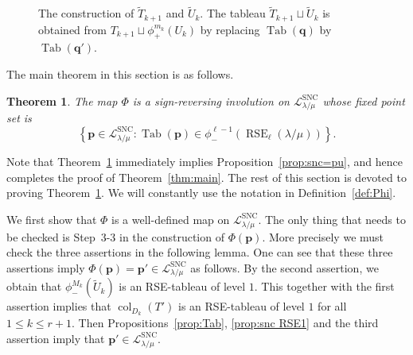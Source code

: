 \documentclass{amsart}
\numberwithin{equation}{section}
\newtheorem{thm}{Theorem}[section]
\theoremstyle{definition}
\newcommand\Tab{\operatorname{Tab}}
\newcommand\LL{\mathcal{L}_\lm}
\newcommand\lsnc{\LL^{\operatorname{SNC}}}
\newcommand\col{\operatorname{col}}
\newcommand\pd{\phi_+}
\newcommand\pu{\phi_-}
\newcommand\RSE{\operatorname{RSE}}
\newcommand\pp{\mathbf{p}}
\newcommand\lm{{\lambda/\mu}}
\begin{document}
\begin{figure}
  \caption{The construction of $\widetilde{T}_{k+1}$ and $\widetilde{U}_{k}$.
    The tableau $\widetilde{T}_{k+1}\sqcup\widetilde{U}_{k}$ is obtained from
    $T_{k+1}\sqcup\pd^{m_k}(U_k)$ by replacing $\Tab(\mathbf{q})$ by
    $\Tab(\mathbf{q'})$.}
  \label{fig:qq'}
\end{figure}


The main theorem in this section is as follows.

\begin{thm}\label{thm:involution}
  The map $\Phi$ is a sign-reversing involution on $\lsnc$ whose fixed point set is
  \[
\left\{\pp\in\lsnc: \Tab(\pp)\in \pu^{\ell-1}(\RSE_\ell(\lm))\right\}.
  \]
\end{thm}

Note that Theorem~\ref{thm:involution} immediately implies
Proposition~\ref{prop:snc=pu}, and hence completes the proof of
Theorem~\ref{thm:main}. The rest of this section is devoted to proving
Theorem~\ref{thm:involution}. We will constantly use the notation in
Definition~\ref{def:Phi}.

We first show that $\Phi$ is a well-defined map on $\lsnc$. The only thing that
needs to be checked is Step~3-3 in the construction of $\Phi(\pp)$. More
precisely we must check the three assertions in the following lemma. One can see
that these three assertions imply $\Phi(\pp)=\pp'\in\lsnc$ as follows. By the
second assertion, we obtain that $\pu^{M_k}(\widetilde{U}_{k})$ is an
RSE-tableau of level $1$. This together with the first assertion implies that
$\col_{D_k}(T')$ is an RSE-tableau of level $1$ for all $1\le k\le r+1$. Then
Propositions~\ref{prop:Tab}, \ref{prop:snc RSE1} and the third assertion
imply that $\pp'\in\lsnc$.
\end{document}
